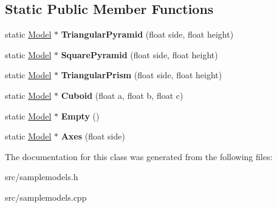 \subsection*{Static Public Member Functions}
\begin{DoxyCompactItemize}
\item 
\mbox{\label{class_sample_models_ac979fefcbc81571af56a2cf3c415497b}} 
static \mbox{\hyperlink{class_model}{Model}} $\ast$ {\bfseries Triangular\+Pyramid} (float side, float height)
\item 
\mbox{\label{class_sample_models_a0a5afe183db2a5e7e59f825e6ac736e6}} 
static \mbox{\hyperlink{class_model}{Model}} $\ast$ {\bfseries Square\+Pyramid} (float side, float height)
\item 
\mbox{\label{class_sample_models_ad9be52995d798b78ad2c04c1b3c1f4e4}} 
static \mbox{\hyperlink{class_model}{Model}} $\ast$ {\bfseries Triangular\+Prism} (float side, float height)
\item 
\mbox{\label{class_sample_models_a5e39e1ad1bcaec4b4ce617332e996caf}} 
static \mbox{\hyperlink{class_model}{Model}} $\ast$ {\bfseries Cuboid} (float a, float b, float c)
\item 
\mbox{\label{class_sample_models_a890001f4e859021afe59bd956245e2ad}} 
static \mbox{\hyperlink{class_model}{Model}} $\ast$ {\bfseries Empty} ()
\item 
\mbox{\label{class_sample_models_a07f69bc5ff6c60078a642ba7e090bf6c}} 
static \mbox{\hyperlink{class_model}{Model}} $\ast$ {\bfseries Axes} (float side)
\end{DoxyCompactItemize}


The documentation for this class was generated from the following files\+:\begin{DoxyCompactItemize}
\item 
src/samplemodels.\+h\item 
src/samplemodels.\+cpp\end{DoxyCompactItemize}
